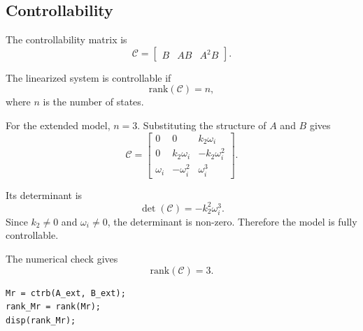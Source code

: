\subsection{Controllability}

The controllability matrix is
\begin{equation}
    \mathcal{C} =
    \begin{bmatrix}
        B & A B & A^2B
    \end{bmatrix}.
\end{equation}

The linearized system is controllable if
\begin{equation}
    \mathrm{rank}(\mathcal{C}) = n,
\end{equation}
where $n$ is the number of states.

For the extended model, $n=3$. Substituting the structure of $A$ and $B$ gives
\begin{equation}
    \mathcal{C} =
    \begin{bmatrix}
        0 & 0 & k_2\omega_i \\
        0 & k_2\omega_i & -k_2\omega_i^2 \\
        \omega_i & -\omega_i^2 & \omega_i^3
    \end{bmatrix}.
\end{equation}

Its determinant is
\begin{equation}
    \det(\mathcal{C}) = -k_2^2\omega_i^3.
\end{equation}
Since $k_2 \neq 0$ and $\omega_i \neq 0$, the determinant is non-zero. Therefore the model is fully
controllable.

The numerical check gives
\begin{equation}
    \mathrm{rank}(\mathcal{C}) = 3.
\end{equation}

\begin{lstlisting}[style=matlabstyle,caption={Controllability check.}]
Mr = ctrb(A_ext, B_ext);
rank_Mr = rank(Mr);
disp(rank_Mr);
\end{lstlisting}
